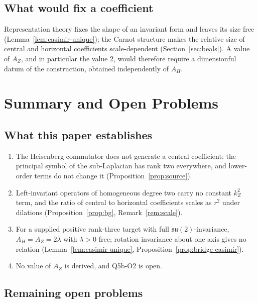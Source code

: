 \documentclass[11pt,a4paper]{article}
\theoremstyle{definition}
\theoremstyle{remark}
\newcommand{\suTwo}{\mathfrak{su}(2)}
\newcommand{\Az}{A_{Z}}
\newcommand{\AH}{A_{H}}
\begin{document}
    \subsection{What would fix a coefficient}

      Representation theory fixes the shape of an invariant form and leaves its size free
      (Lemma~\ref{lem:casimir-unique}); the Carnot structure makes the relative size of central and horizontal
      coefficients scale-dependent (Section~\ref{sec:beals}).
      A value of $\Az$, and in particular the value $2$, would therefore require a dimensionful datum of the
      construction, obtained independently of $\AH$.

  \section{Summary and Open Problems}\label{sec:summary}

    \subsection{What this paper establishes}

      \begin{enumerate}
        \item The Heisenberg commutator does not generate a central coefficient: the principal symbol of the
        sub-Laplacian has rank two everywhere, and lower-order terms do not change it
        (Proposition~\ref{prop:source}).
        \item Left-invariant operators of homogeneous degree two carry no constant $k_Z^2$ term, and the ratio of
        central to horizontal coefficients scales as $r^2$ under dilations (Proposition~\ref{prop:bg},
        Remark~\ref{rem:scale}).
        \item For a supplied positive rank-three target with full $\suTwo$-invariance, $\AH = \Az = 2\lambda$ with
        $\lambda > 0$ free; rotation invariance about one axis gives no relation (Lemma~\ref{lem:casimir-unique},
        Proposition~\ref{prop:bridge-casimir}).
        \item No value of $\Az$ is derived, and Q5b-O2 is open.
      \end{enumerate}

    \subsection{Remaining open problems}
\end{document}
